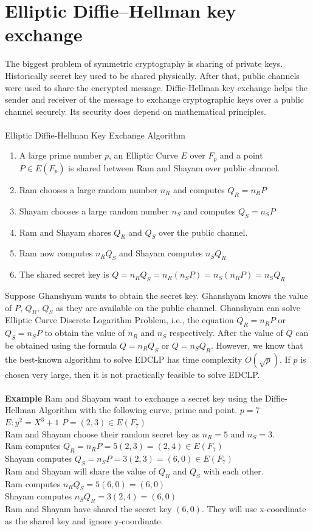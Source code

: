 \documentclass[a4paper,12pt]{report}
\begin{document}
\section{Elliptic Diﬃe–Hellman key exchange}
The biggest problem of symmetric cryptography is sharing of private keys. Historically secret key used to be shared physically. After that, public channels were used to share the encrypted message. Diffie-Hellman key exchange helps the sender and receiver of the message to exchange cryptographic keys over a public channel securely. Its security does depend on mathematical principles. \\\\
Elliptic Diﬃe-Hellman Key Exchange Algorithm
\begin{enumerate}
	\item A large prime number $p$, an Elliptic Curve $E$ over $F_p$ and a point $P \in E(F_p)$  is shared between Ram and Shayam over public channel.
	\item Ram chooses a large random number $n_R$ and computes $Q_R = n_R P$
	\item Shayam chooses a large random number $n_S$ and computes $Q_S = n_S P$
	\item Ram and Shayam shares $Q_R$ and $Q_S$ over the public channel.
	\item Ram now computes $n_R Q_S$ and Shayam computes $n_S Q_R$
	\item The shared secret key is $Q=n_R Q_S=n_R (n_S P)=n_S (n_R P)=n_S Q_R$
\end{enumerate}
Suppose Ghanshyam wants to obtain the secret key. Ghanshyam knows the value of $P$, $Q_R$, $Q_S$ as they are available on the public channel. Ghanshyam can solve Elliptic Curve Discrete Logarithm Problem, i.e., the equation $Q_R = n_R P$ or $Q_S = n_S P$ to obtain the value of $n_R$ and $n_S$ respectively. After the value of $Q$ can be obtained using the formula $Q=n_R Q_S$ or $Q=n_S Q_R$. However, we know that the best-known algorithm to solve EDCLP has time complexity $O(\sqrt{p})$. If $p$ is chosen very large, then it is not practically feasible to solve EDCLP.\\\\
\textbf{Example}
Ram and Shayam want to exchange a secret key using the Diffie-Hellman Algorithm with the following curve, prime and point.
$p=7$
$E:y^2=X^3+1$
$P=(2,3) \in E(F_7)$\\
Ram and Shayam choose their random secret key as $n_R=5$ and $n_S=3$.\\
Ram computes $Q_R = n_R P = 5(2,3)=(2,4) \in E(F_7)$\\
Shayam computes $Q_S = n_S P = 3(2,3)=(6,0)\in E(F_7)$\\
Ram and Shayam will share the value of $Q_R$ and $Q_S$ with each other.\\
Ram computes $n_R Q_S= 5 (6,0) = (6,0)$\\
Shayam computes $n_S Q_R= 3 (2,4) = (6,0)$\\
Ram and Shayam have shared the secret key $(6,0)$. They will use x-coordinate as the shared key and ignore y-coordinate.
\end{document}
